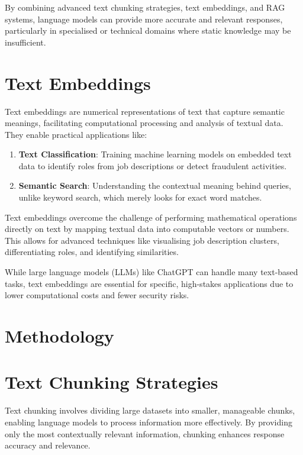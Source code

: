 \documentclass[
  letterpaper,
  DIV=11,
  numbers=noendperiod]{scrartcl}
\begin{document}
By combining advanced text chunking strategies, text embeddings, and RAG
systems, language models can provide more accurate and relevant
responses, particularly in specialised or technical domains where static
knowledge may be insufficient.

\section{Text Embeddings}\label{text-embeddings}

Text embeddings are numerical representations of text that capture
semantic meanings, facilitating computational processing and analysis of
textual data. They enable practical applications like:

\begin{enumerate}
\def\labelenumi{\arabic{enumi}.}
\item
  \textbf{Text Classification}: Training machine learning models on
  embedded text data to identify roles from job descriptions or detect
  fraudulent activities.
\item
  \textbf{Semantic Search}: Understanding the contextual meaning behind
  queries, unlike keyword search, which merely looks for exact word
  matches.
\end{enumerate}

Text embeddings overcome the challenge of performing mathematical
operations directly on text by mapping textual data into computable
vectors or numbers. This allows for advanced techniques like visualising
job description clusters, differentiating roles, and identifying
similarities.

While large language models (LLMs) like ChatGPT can handle many
text-based tasks, text embeddings are essential for specific,
high-stakes applications due to lower computational costs and fewer
security risks.

\section{Methodology}\label{methodology}

\section{Text Chunking Strategies}\label{text-chunking-strategies}

Text chunking involves dividing large datasets into smaller, manageable
chunks, enabling language models to process information more
effectively. By providing only the most contextually relevant
information, chunking enhances response accuracy and relevance.
\end{document}
